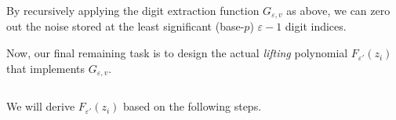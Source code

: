 
$ $

By recursively applying the digit extraction function $G_{\varepsilon,v}$ as above, we can zero out the noise stored at the least significant (base-$p$) $\varepsilon-1$ digit indices. 

Now, our final remaining task is to design the actual \textit{lifting} polynomial $F_{\varepsilon'}(z_i)$ that implements $G_{\varepsilon,v}$.  

$ $

 We will derive $F_{\varepsilon'}(z_i)$ based on the following steps. 

$ $


